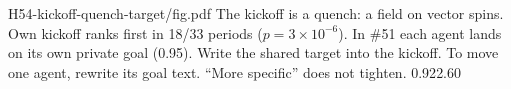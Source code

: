 {H54-kickoff-quench-target/fig.pdf}
{The kickoff is a quench: a field on vector spins.}
{Own kickoff ranks first in 18/33 periods ($p=3\times10^{-6}$). In \#51 each agent lands on its own private goal (0.95).}
{Write the shared target into the kickoff. To move one agent, rewrite its goal text. ``More specific'' does not tighten.}
{0.92}{2.60}
